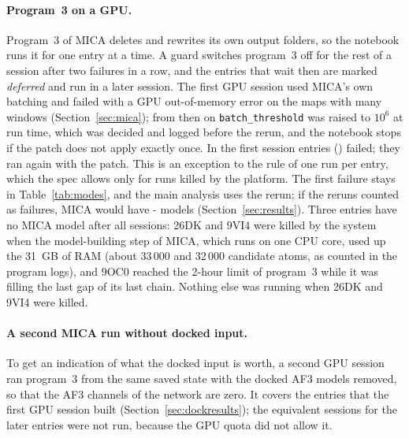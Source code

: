 \paragraph{Program~3 on a GPU.}
Program~3 of MICA deletes and rewrites its own output folders, so the notebook runs it for one entry at a time. A guard switches program~3 off for the rest of a session after two failures in a row, and the entries that wait then are marked \emph{deferred} and run in a later session. The first GPU session used MICA's own batching and failed with a GPU out-of-memory error on the maps with many windows (Section~\ref{sec:mica}); from then on \texttt{batch\_threshold} was raised to $10^6$ at run time, which was decided and logged before the rerun, and the notebook stops if the patch does not apply exactly once. In the first session \NRerunMica{} entries (\RerunMicaList{}) failed; they ran again with the patch. This is an exception to the rule of one run per entry, which the spec allows only for runs killed by the platform. The first failure stays in Table~\ref{tab:modes}, and the main analysis uses the rerun; if the reruns counted as failures, MICA would have \number\numexpr\NModelMica-\NRerunMica\relax{} models (Section~\ref{sec:results}). Three entries have no MICA model after all sessions: 26DK and 9VI4 were killed by the system when the model-building step of MICA, which runs on one CPU core, used up the 31~GB of RAM (about 33\,000 and 32\,000 candidate atoms, as counted in the program logs), and 9OC0 reached the 2-hour limit of program~3 while it was filling the last gap of its last chain. Nothing else was running when 26DK and 9VI4 were killed.

\paragraph{A second MICA run without docked input.}
To get an indication of what the docked input is worth, a second GPU session ran program~3 from the same saved state with the docked AF3 models removed, so that the AF3 channels of the network are zero. It covers the \DockEffectN{} entries that the first GPU session built (Section~\ref{sec:dockresults}); the equivalent sessions for the later entries were not run, because the GPU quota did not allow it.

